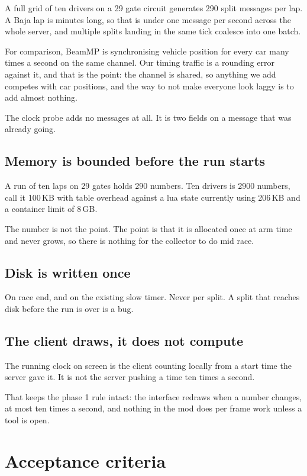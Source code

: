 \documentclass[11pt,a4paper]{article}
\begin{document}
A full grid of ten drivers on a 29 gate circuit generates 290 split messages
per lap. A Baja lap is minutes long, so that is under one message per second
across the whole server, and multiple splits landing in the same tick coalesce
into one batch.

For comparison, BeamMP is synchronising vehicle position for every car many
times a second on the same channel. Our timing traffic is a rounding error
against it, and that is the point: the channel is shared, so anything we add
competes with car positions, and the way to not make everyone look laggy is to
add almost nothing.

The clock probe adds no messages at all. It is two fields on a message that was
already going.

\subsection*{Memory is bounded before the run starts}

A run of ten laps on 29 gates holds 290 numbers. Ten drivers is 2900 numbers,
call it 100\,KB with table overhead against a lua state currently using 206\,KB
and a container limit of 8\,GB.

The number is not the point. The point is that it is allocated once at arm time
and never grows, so there is nothing for the collector to do mid race.

\subsection*{Disk is written once}

On race end, and on the existing slow timer. Never per split. A split that
reaches disk before the run is over is a bug.

\subsection*{The client draws, it does not compute}

The running clock on screen is the client counting locally from a start time
the server gave it. It is not the server pushing a time ten times a second.

That keeps the phase 1 rule intact: the interface redraws when a number
changes, at most ten times a second, and nothing in the mod does per frame
work unless a tool is open.

\section{Acceptance criteria}
\end{document}
